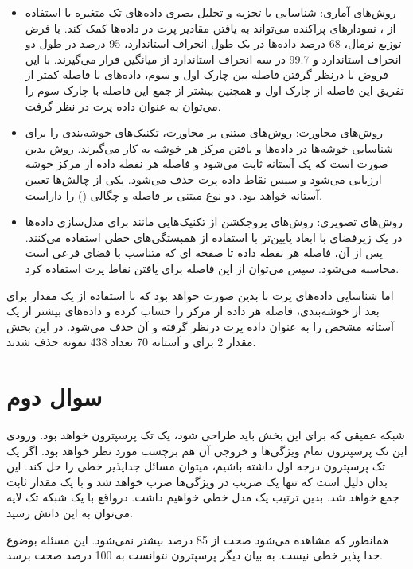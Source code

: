 \documentclass{article}
\begin{document}
\begin{itemize}
    \item روش‌های آماری: شناسایی با تجزیه و تحلیل بصری داده‌های تک متغیره با استفاده از ، نمودارهای پراکنده می‌تواند به یافتن مقادیر پرت در داده‌ها کمک کند. با فرض توزیع نرمال، 68 درصد داده‌ها در یک طول انحراف استاندارد، 95 درصد در طول دو انحراف استاندارد و 99.7 در سه انحراف استاندارد از میانگین قرار می‌گیرند. با این فروض با درنظر گرفتن فاصله بین چارک اول و سوم، داده‌های با فاصله کمتر از تفریق این فاصله از چارک اول و همچنین بیشتر از جمع این فاصله با چارک سوم را می‌توان به عنوان داده پرت در نظر گرفت.
    \item روش‌های مجاورت: روش‌های مبتنی بر مجاورت، تکنیک‌های خوشه‌بندی را برای شناسایی خوشه‌ها در داده‌ها و یافتن مرکز هر خوشه به کار می‌گیرند. روش بدین صورت است که یک آستانه ثابت می‌شود و فاصله هر نقطه داده از مرکز خوشه ارزیابی می‌شود و سپس نقاط داده پرت حذف می‌شود. یکی از چالش‌ها تعیین آستانه خواهد بود. دو نوع مبتنی بر فاصله و چگالی () را داراست.
    \item روش‌های تصویری: روش‌های پروجکشن از تکنیک‌هایی مانند  برای مدل‌سازی داده‌ها در یک زیرفضای با ابعاد پایین‌تر با استفاده از همبستگی‌های خطی استفاده می‌کنند. پس از آن، فاصله هر نقطه داده تا صفحه ای که متناسب با فضای فرعی است محاسبه می‌شود. سپس می‌توان از این فاصله برای یافتن نقاط پرت استفاده کرد.
\end{itemize}


اما شناسایی داده‌های پرت با  بدین صورت خواهد بود که با استفاده از یک مقدار برای  بعد از خوشه‌بندی، فاصله هر داده از مرکز را حساب کرده و داده‌های بیشتر از یک آستانه مشخص را به عنوان داده پرت درنظر گرفته و آن حذف می‌شود. در این بخش مقدار 2 برای  و آستانه 70 تعداد  438 نمونه حذف شدند.


\section{سوال دوم}

شبکه عمیقی که برای این بخش باید طراحی شود، یک تک پرسپترون خواهد بود. ورودی این تک پرسپترون تمام ویژگی‌ها و خروجی آن هم برچسب مورد نظر خواهد بود. اگر یک تک پرسپترون درجه اول داشته باشیم، میتوان مسائل جداپذیر خطی را حل کند. این بدان دلیل است که تنها یک ضریب در ویژگی‌ها ضرب خواهد شد و با یک مقدار ثابت جمع خواهد شد. بدین ترتیب یک مدل خطی خواهیم داشت. درواقع با یک شبکه تک لایه می‌توان به این دانش رسید.

همانطور که مشاهده می‌شود صحت از 85 درصد بیشتر نمی‌شود. این مسئله بوضوع جدا پذیر خطی نیست. به بیان دیگر پرسپترون نتوانست به 100 درصد صحت برسد.
\end{document}
